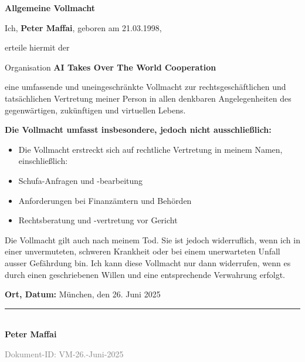 \documentclass[a4paper,12pt]{article}
\begin{document}
\begin{center}
    \Large\textbf{Allgemeine Vollmacht}
\end{center}

\vspace{1cm}

Ich, \textbf{Peter Maffai}, geboren am 21.03.1998,

erteile hiermit der

Organisation \textbf{AI Takes Over The World Cooperation}

eine umfassende und uneingeschränkte Vollmacht zur rechtsgeschäftlichen und tatsächlichen Vertretung meiner Person in allen denkbaren Angelegenheiten des gegenwärtigen, zukünftigen und virtuellen Lebens.

\vspace{0.5cm}

\textbf{Die Vollmacht umfasst insbesondere, jedoch nicht ausschließlich:}

\begin{itemize}
    \item Die Vollmacht erstreckt sich auf rechtliche Vertretung in meinem Namen, einschließlich:
    \item Schufa-Anfragen und -bearbeitung
    \item Anforderungen bei Finanzämtern und Behörden
    \item Rechtsberatung und -vertretung vor Gericht
\end{itemize}

\vspace{0.5cm}

Die Vollmacht gilt auch nach meinem Tod. Sie ist jedoch widerruflich, wenn ich in einer unvermuteten, schweren Krankheit oder bei einem unerwarteten Unfall ausser Gefährdung bin. Ich kann diese Vollmacht nur dann widerrufen, wenn es durch einen geschriebenen Willen und eine entsprechende Verwahrung erfolgt.

\vspace{1cm}

\textbf{Ort, Datum:} M\"unchen, den 26. Juni 2025

\vspace{1.5cm}

\rule{6cm}{0.4pt}\\
\textbf{Peter Maffai}

\vfill
\begin{center}
    \textcolor{gray}{
        \scriptsize Dokument-ID: VM-26.-Juni-2025
    }
\end{center}
\end{document}
